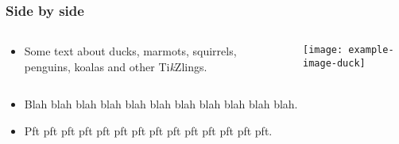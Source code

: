 \documentclass{beamer}
\begin{document}
\begin{frame}[t]
\frametitle{Side by side}
\begin{columns}[onlytextwidth]
\begin{column}{3cm}
\begin{itemize}
 \item Some text about ducks, marmots, squirrels, penguins, koalas 
 and other Ti\emph{k}Zlings.
\end{itemize}
\end{column}
\begin{column}{\the\dimexpr\textwidth-3cm}%
\texttt{[image: example-image-duck]}
\end{column}
\end{columns}
\begin{itemize}
 \item Blah blah blah blah blah blah blah blah blah blah blah.
 \item Pft pft pft pft pft pft pft pft pft pft pft pft pft pft.
\end{itemize}

\end{frame}
\end{document}
